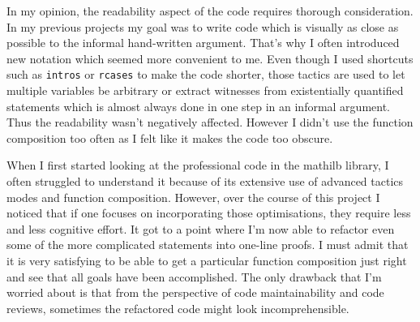 \documentclass[11pt]{article}
\begin{document}
In my opinion, the readability aspect of the code requires thorough consideration.
In my previous projects my goal was to write code which is visually as close as possible
to the informal hand-written argument. That's why I often introduced new notation which
seemed more convenient to me. Even though I used shortcuts such as \texttt{intros} or \texttt{rcases} to make
the code shorter, those tactics are used to let multiple variables be arbitrary
or extract witnesses from existentially quantified statements which is almost always
done in one step in an informal argument. Thus the readability wasn't negatively affected.
However I didn't use the function composition too often as I felt like it
makes the code too obscure.

When I first started looking at the professional code in the mathilb
library, I often struggled to understand it because of its extensive use of advanced
tactics modes and function composition. However, over the course of this project
I noticed that if one focuses on incorporating those optimisations, they require
less and less cognitive effort. It got to a point where I'm now able to
refactor even some of the more complicated statements into one-line proofs.
I must admit that it is very satisfying to be able to get a particular function
composition just right and see that all goals have been accomplished. The only
drawback that I'm worried about is that from the perspective of code maintainability
and code reviews, sometimes the refactored code might look incomprehensible.
\end{document}
